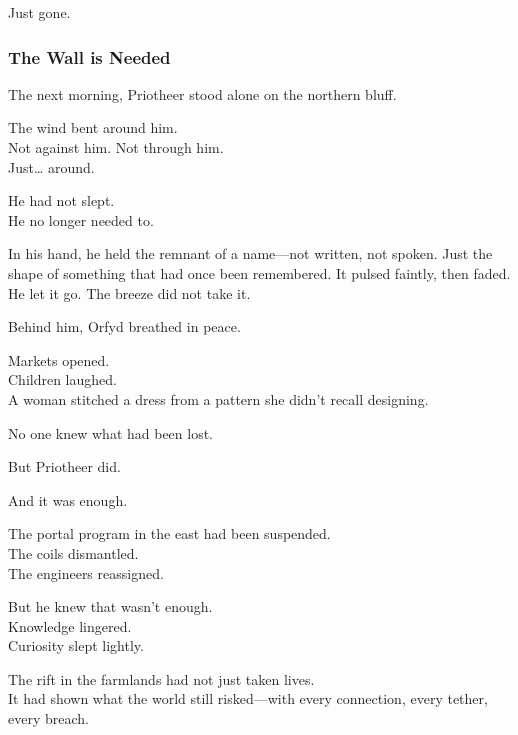 \documentclass[12pt]{article}
\begin{document}
\vspace{0.5em}
Just gone.

\dotfill

\subsubsection{The Wall is Needed}

The next morning, Priotheer stood alone on the northern bluff.

\vspace{0.5em}
The wind bent around him.\\
Not against him. Not through him.\\
Just\ldots{} around.

\vspace{0.5em}
He had not slept.\\
He no longer needed to.

\vspace{0.5em}
In his hand, he held the remnant of a name---not written, not spoken. Just the shape of something that had once been remembered. It pulsed faintly, then faded. He let it go. The breeze did not take it.

\vspace{0.5em}
Behind him, Orfyd breathed in peace.

\vspace{0.5em}
Markets opened.\\
Children laughed.\\
A woman stitched a dress from a pattern she didn’t recall designing.

\vspace{0.5em}
No one knew what had been lost.

\vspace{0.5em}
But Priotheer did.

\vspace{0.5em}
And it was enough.

\vspace{0.5em}
The portal program in the east had been suspended.\\
The coils dismantled.\\
The engineers reassigned.

\vspace{0.5em}
But he knew that wasn’t enough.\\
Knowledge lingered.\\
Curiosity slept lightly.

\vspace{0.5em}
The rift in the farmlands had not just taken lives.\\
It had shown what the world still risked---with every connection, every tether, every breach.
\end{document}
